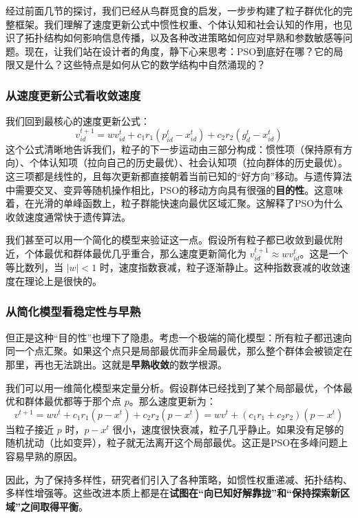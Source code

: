 \documentclass[lang=cn,zihao=-4,a4paper,fontset=windows]{beautybook}
\begin{document}
经过前面几节的探讨，我们已经从鸟群觅食的启发，一步步构建了粒子群优化的完整框架。我们理解了速度更新公式中惯性权重、个体认知和社会认知的作用，也见识了拓扑结构如何影响信息传播，以及各种改进策略如何应对早熟和参数敏感等问题。现在，让我们站在设计者的角度，静下心来思考：PSO到底好在哪？它的局限又是什么？这些特点是如何从它的数学结构中自然涌现的？

\subsubsection{从速度更新公式看收敛速度}

我们回到最核心的速度更新公式：
\[
v_{id}^{t+1} = w v_{id}^t + c_1 r_1 (p_{id}^t - x_{id}^t) + c_2 r_2 (g_d^t - x_{id}^t)
\]
这个公式清晰地告诉我们，粒子的下一步运动由三部分构成：惯性项（保持原有方向）、个体认知项（拉向自己的历史最优）、社会认知项（拉向群体的历史最优）。这三项都是线性的，且每次更新都直接朝着当前已知的“好方向”移动。与遗传算法中需要交叉、变异等随机操作相比，PSO的移动方向具有很强的\textbf{目的性}。这意味着，在光滑的单峰函数上，粒子群能快速向最优区域汇聚。这解释了PSO为什么收敛速度通常快于遗传算法。

我们甚至可以用一个简化的模型来验证这一点。假设所有粒子都已收敛到最优附近，个体最优和群体最优几乎重合，那么速度更新简化为 \( v_{id}^{t+1} \approx w v_{id}^t \)。这是一个等比数列，当 \( |w| < 1 \) 时，速度指数衰减，粒子逐渐静止。这种指数衰减的收敛速度在理论上是很快的。

\subsubsection{从简化模型看稳定性与早熟}

但正是这种“目的性”也埋下了隐患。考虑一个极端的简化模型：所有粒子都迅速向同一个点汇聚。如果这个点只是局部最优而非全局最优，那么整个群体会被锁定在那里，再也无法跳出。这就是\textbf{早熟收敛}的数学根源。

我们可以用一维简化模型来定量分析。假设群体已经找到了某个局部最优，个体最优和群体最优都等于那个点 \( p \)。那么速度更新为：
\[
v^{t+1} = w v^t + c_1 r_1 (p - x^t) + c_2 r_2 (p - x^t) = w v^t + (c_1 r_1 + c_2 r_2)(p - x^t)
\]
当粒子接近 \( p \) 时，\( p - x^t \) 很小，速度很快衰减，粒子几乎静止。如果没有足够的随机扰动（比如变异），粒子就无法离开这个局部最优。这正是PSO在多峰问题上容易早熟的原因。

因此，为了保持多样性，研究者们引入了各种策略，如惯性权重递减、拓扑结构、多样性增强等。这些改进本质上都是在\textbf{试图在“向已知好解靠拢”和“保持探索新区域”之间取得平衡}。
\end{document}
